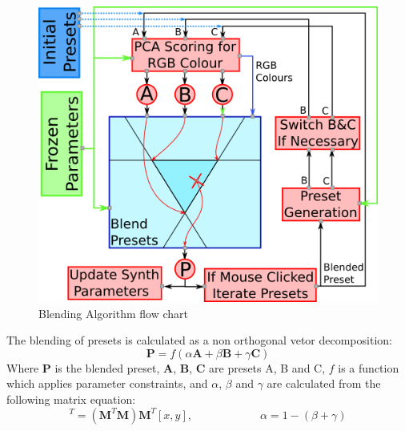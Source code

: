 \documentclass[11pt, oneside]{report}   	%
\renewcommand{\vec}[1]{\mathbf{#1}}
\begin{document}
\begin{figure}[h] 
	\centering
	\includegraphics[width = 5in]{BlendingAlgorithm.png}
	\caption{Blending Algorithm flow chart}
	\label{fig:BlendingAlgorithm}
\end{figure}
%
The blending of presets is calculated as a non orthogonal vetor decomposition: \cite{NonOrthogonal}
\begin{equation}
	\vec{P} = f(\alpha\vec{A} + \beta\vec{B} + \gamma\vec{C})
	\label{eq:PresetMix}
\end{equation}
Where $\vec{P}$ is the blended preset, $\vec{A}$, $\vec{B}$, $\vec{C}$ are presets A, B and C, $f$ is a function which applies parameter constraints, and $\alpha$, $\beta$ and $\gamma$ are calculated from the following matrix equation:
\begin{equation}
[\beta,  \gamma]^T = (\vec{M}^T\vec{M})\vec{M}^T[x, y], 
	\hspace{1in} \alpha = 1 - (\beta + \gamma)
\end{equation}
\end{document}
